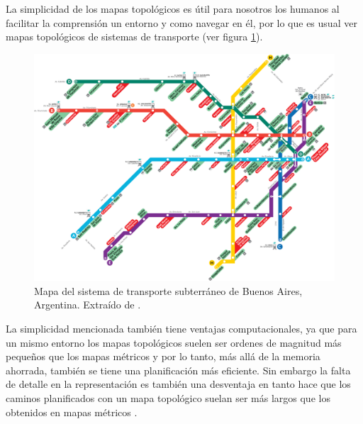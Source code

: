 La simplicidad de los mapas topológicos es útil para nosotros los humanos al facilitar la comprensión un entorno y como navegar en él, por lo que es usual ver mapas topológicos de sistemas de transporte (ver figura \ref{fig:metroBsAs}).%

\begin{figure}[H]
  \center
  \includegraphics[width=1\linewidth]{imagenes/metroBsAs.png}
  \caption[Mapa del sistema de transporte subterráneo de Buenos Aires, Argentina.]{Mapa del sistema de transporte subterráneo de Buenos Aires, Argentina. Extraído de \cite{metroBsAs}.}\label{fig:metroBsAs}
\end{figure} 

La simplicidad mencionada también tiene ventajas computacionales, ya que para un mismo entorno los mapas topológicos suelen ser ordenes de magnitud más pequeños que los mapas métricos y por lo tanto, más allá de la memoria ahorrada, también se tiene una planificación más eficiente. Sin embargo la falta de detalle en la representación es también una desventaja en tanto hace que los caminos planificados con un mapa topológico suelan ser más largos que los obtenidos en mapas métricos \cite{Thrun1998}.

